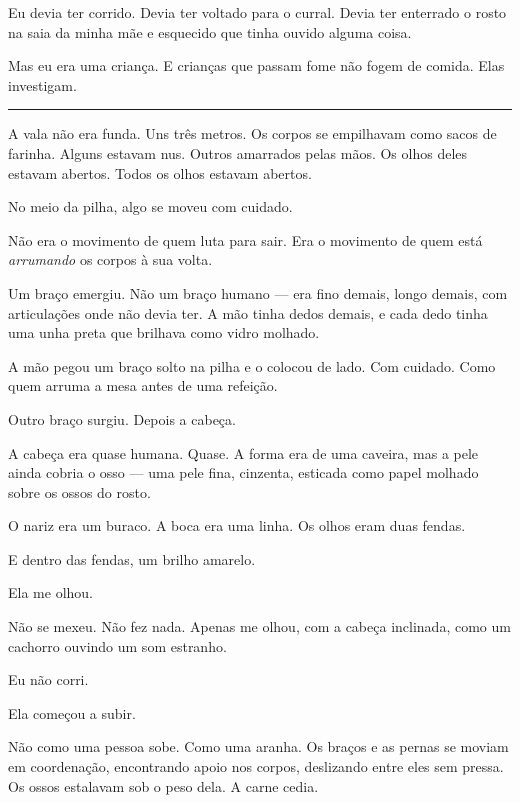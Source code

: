 \noindent Eu devia ter corrido. Devia ter voltado para o curral. Devia ter enterrado o rosto na saia da minha mãe e esquecido que tinha ouvido alguma coisa.

\noindent Mas eu era uma criança.
E crianças que passam fome não fogem de comida.
Elas investigam.

\vspace{0.5em}\noindent\rule{\textwidth}{0.5pt}\vspace{0.5em}

\noindent A vala não era funda. Uns três metros. Os corpos se empilhavam como sacos de farinha. Alguns estavam nus. Outros amarrados pelas mãos. Os olhos deles estavam abertos. Todos os olhos estavam abertos.

\noindent No meio da pilha, algo se moveu com cuidado.

\noindent Não era o movimento de quem luta para sair.
Era o movimento de quem está \textit{arrumando} os corpos à sua volta.

\noindent Um braço emergiu. Não um braço humano --- era fino demais, longo demais, com articulações onde não devia ter. A mão tinha dedos demais, e cada dedo tinha uma unha preta que brilhava como vidro molhado.

\noindent A mão pegou um braço solto na pilha e o colocou de lado. Com cuidado. Como quem arruma a mesa antes de uma refeição.

\noindent Outro braço surgiu. Depois a cabeça.

\noindent A cabeça era quase humana. Quase. A forma era de uma caveira, mas a pele ainda cobria o osso --- uma pele fina, cinzenta, esticada como papel molhado sobre os ossos do rosto.

\noindent O nariz era um buraco.
A boca era uma linha.
Os olhos eram duas fendas.

\noindent E dentro das fendas, um brilho amarelo.

\noindent Ela me olhou.

\noindent Não se mexeu. Não fez nada. Apenas me olhou, com a cabeça inclinada, como um cachorro ouvindo um som estranho.

\noindent Eu não corri.

\noindent Ela começou a subir.

\noindent Não como uma pessoa sobe. Como uma aranha. Os braços e as pernas se moviam em coordenação, encontrando apoio nos corpos, deslizando entre eles sem pressa. Os ossos estalavam sob o peso dela. A carne cedia.

